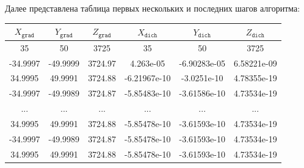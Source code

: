 \documentclass[12pt, a4paper, oneside, final]{article}
\begin{document}
	Далее представлена таблица первых нескольких и последних шагов алгоритма:
	\begin{table}[H]
		\centering
		\begin{tabular}{|c|c|c|c|c|c|}
			$X_{\texttt{grad}}$ & $Y_{\texttt{grad}}$ & $Z_{\texttt{grad}}$ & $X_{\texttt{dich}}$ & $Y_{\texttt{dich}}$ & $Z_{\texttt{dich}}$ \\ \hline
			35&50&3725&35&50&3725 \\
			-34.9997&-49.9999&3724.97&4.263e-05&-6.90283e-05&6.58221e-09 \\
			34.9995&49.9991&3724.88&-6.21967e-10&-3.0251e-10&4.78355e-19 \\
			-34.9997&-49.9989&3724.87&-5.85483e-10&-3.61586e-10&4.73534e-19 \\
			...&...&...&...&...&... \\
			34.9995&49.9991&3724.88&-5.85478e-10&-3.61593e-10&4.73534e-19 \\
			-34.9997&-49.9989&3724.87&-5.85478e-10&-3.61593e-10&4.73534e-19 \\
			34.9995&49.9991&3724.88&-5.85478e-10&-3.61593e-10&4.73534e-19	
		\end{tabular}
	\end{table}
\end{document}
